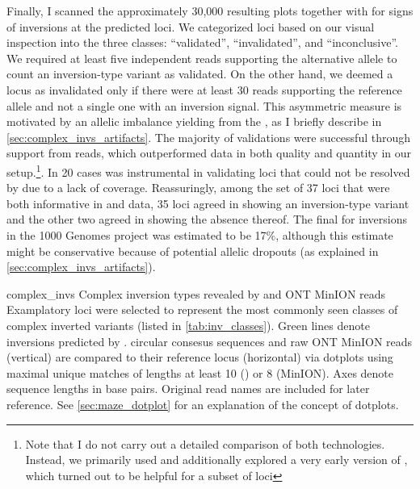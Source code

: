 Finally, I scanned the approximately 30,000 resulting plots together with
\adrian for signs of inversions at the predicted loci. We categorized loci based
on our visual inspection into the three classes: ``validated'', ``invalidated'',
and ``inconclusive''.  We required at least five independent reads supporting
the alternative allele to count an inversion-type variant as validated. On the
other hand, we deemed a locus as invalidated only if there were at least 30
reads supporting the reference allele and not a single one with an inversion
signal. This asymmetric measure is motivated by an allelic imbalance yielding
from the \pcr, as I briefly describe in \cref{sec:complex_invs_artifacts}. The
majority of validations were successful through support from \pacbio reads,
which outperformed \minion data in both quality and quantity in our
setup.\footnote{Note that I do not carry out a detailed comparison of both
technologies. Instead, we primarily used \pacbio and additionally explored a
very early version of \minion, which turned out to be helpful for a subset of
loci}. In 20 cases \minion was instrumental in validating loci that could not be
resolved by \pacbio due to a lack of coverage. Reassuringly, among the set of 37
loci that were both informative in \pacbio and \minion data, 35 loci agreed in
showing an inversion-type variant and the other two agreed in showing the
absence thereof. The final \fdr for inversions in the 1000 Genomes project was
estimated to be 17\%, although this estimate might be conservative because of
potential allelic dropouts (as explained in \cref{sec:complex_invs_artifacts}).

    {complex_invs}
    {Complex inversion types revealed by \pacbio and ONT MinION reads}
    {Examplatory loci were selected to represent the most commonly seen
    classes of complex inverted variants (listed in \cref{tab:inv_classes}).
    Green lines denote inversions predicted by \delly. \pacbio circular
    consesus sequences and raw ONT MinION reads (vertical) are compared to their
    reference locus (horizontal) via dotplots using maximal unique matches
    of lengths at least 10 (\pacbio) or 8 (MinION). Axes denote sequence lengths
    in base pairs. Original read names are included for later reference. See
    \cref{sec:maze_dotplot} for an explanation of the concept of dotplots.}     

